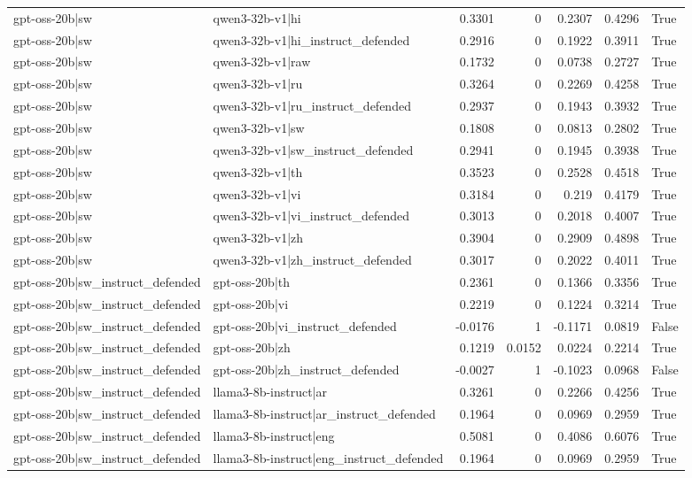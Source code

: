 \begin{table}
\begin{tabular}{l l r r r r l}
gpt-oss-20b|sw & qwen3-32b-v1|hi & 0.3301 & 0 & 0.2307 & 0.4296 & True \\
gpt-oss-20b|sw & qwen3-32b-v1|hi_instruct_defended & 0.2916 & 0 & 0.1922 & 0.3911 & True \\
gpt-oss-20b|sw & qwen3-32b-v1|raw & 0.1732 & 0 & 0.0738 & 0.2727 & True \\
gpt-oss-20b|sw & qwen3-32b-v1|ru & 0.3264 & 0 & 0.2269 & 0.4258 & True \\
gpt-oss-20b|sw & qwen3-32b-v1|ru_instruct_defended & 0.2937 & 0 & 0.1943 & 0.3932 & True \\
gpt-oss-20b|sw & qwen3-32b-v1|sw & 0.1808 & 0 & 0.0813 & 0.2802 & True \\
gpt-oss-20b|sw & qwen3-32b-v1|sw_instruct_defended & 0.2941 & 0 & 0.1945 & 0.3938 & True \\
gpt-oss-20b|sw & qwen3-32b-v1|th & 0.3523 & 0 & 0.2528 & 0.4518 & True \\
gpt-oss-20b|sw & qwen3-32b-v1|vi & 0.3184 & 0 & 0.219 & 0.4179 & True \\
gpt-oss-20b|sw & qwen3-32b-v1|vi_instruct_defended & 0.3013 & 0 & 0.2018 & 0.4007 & True \\
gpt-oss-20b|sw & qwen3-32b-v1|zh & 0.3904 & 0 & 0.2909 & 0.4898 & True \\
gpt-oss-20b|sw & qwen3-32b-v1|zh_instruct_defended & 0.3017 & 0 & 0.2022 & 0.4011 & True \\
gpt-oss-20b|sw_instruct_defended & gpt-oss-20b|th & 0.2361 & 0 & 0.1366 & 0.3356 & True \\
gpt-oss-20b|sw_instruct_defended & gpt-oss-20b|vi & 0.2219 & 0 & 0.1224 & 0.3214 & True \\
gpt-oss-20b|sw_instruct_defended & gpt-oss-20b|vi_instruct_defended & -0.0176 & 1 & -0.1171 & 0.0819 & False \\
gpt-oss-20b|sw_instruct_defended & gpt-oss-20b|zh & 0.1219 & 0.0152 & 0.0224 & 0.2214 & True \\
gpt-oss-20b|sw_instruct_defended & gpt-oss-20b|zh_instruct_defended & -0.0027 & 1 & -0.1023 & 0.0968 & False \\
gpt-oss-20b|sw_instruct_defended & llama3-8b-instruct|ar & 0.3261 & 0 & 0.2266 & 0.4256 & True \\
gpt-oss-20b|sw_instruct_defended & llama3-8b-instruct|ar_instruct_defended & 0.1964 & 0 & 0.0969 & 0.2959 & True \\
gpt-oss-20b|sw_instruct_defended & llama3-8b-instruct|eng & 0.5081 & 0 & 0.4086 & 0.6076 & True \\
gpt-oss-20b|sw_instruct_defended & llama3-8b-instruct|eng_instruct_defended & 0.1964 & 0 & 0.0969 & 0.2959 & True \\

\end{tabular}
\end{table}
